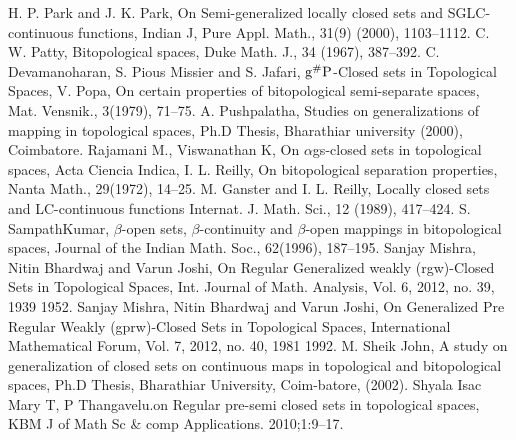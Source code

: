 \begin{thebibliography}{99}
H. P. Park and J. K. Park, On Semi-generalized locally closed sets and SGLC-continuous functions, Indian J, Pure Appl. Math., 31(9) (2000), 1103--1112.
 C. W. Patty, Bitopological spaces, Duke Math. J., 34 (1967), 387--392.
 C. Devamanoharan, S. Pious Missier and S. Jafari, $\mathrm{g}^{\text{\#}}\mathrm{P}$-Closed sets in Topological Spaces,
 V. Popa, On certain properties of bitopological semi-separate spaces, Mat. Vensnik., 3(1979), 71--75.
 A. Pushpalatha, Studies on generalizations of mapping in topological spaces, Ph.D Thesis, Bharathiar university (2000), Coimbatore.
 Rajamani M., Viswanathan K, On $\alpha$gs-closed sets in topological spaces, Acta Ciencia Indica,
 I. L. Reilly, On bitopological separation properties, Nanta Math., 29(1972), 14--25.
 M. Ganster and I. L. Reilly, Locally closed sets and LC-continuous functions Internat. J. Math. Sci., 12 (1989), 417--424.
 S. SampathKumar, $\beta$-open sets, $\beta$-continuity and $\beta$-open mappings in bitopological spaces, Journal of the Indian Math. Soc., 62(1996), 187--195.
 Sanjay Mishra, Nitin Bhardwaj and Varun Joshi, On Regular Generalized weakly (rgw)-Closed Sets in Topological Spaces, Int. Journal of Math. Analysis, Vol. 6, 2012, no. 39, 1939 1952.
 Sanjay Mishra, Nitin Bhardwaj and Varun Joshi, On Generalized Pre Regular Weakly (gprw)-Closed Sets in Topological Spaces, International Mathematical Forum, Vol. 7, 2012, no. 40, 1981 1992.
 M. Sheik John, A study on generalization of closed sets on continuous maps in topological and bitopological spaces, Ph.D Thesis, Bharathiar University, Coim-batore, (2002).
 Shyala Isac Mary T, P Thangavelu.on Regular pre-semi closed sets in topological spaces, KBM J of Math Sc \& comp Applications. 2010;1:9--17.

\end{thebibliography}
